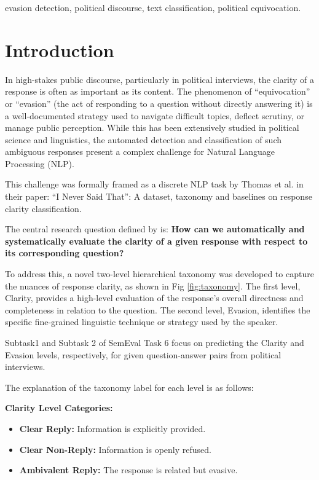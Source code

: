 \documentclass[conference]{IEEEtran}
\begin{document}
\begin{IEEEkeywords}
evasion detection, political discourse, text classification, political equivocation.
\end{IEEEkeywords}

\section{Introduction}
In high-stakes public discourse, particularly in political interviews, the clarity of a response is often as important as its content. The phenomenon of ``equivocation'' or ``evasion'' (the act of responding to a question without directly answering it) is a well-documented strategy used to navigate difficult topics, deflect scrutiny, or manage public perception. While this has been extensively studied in political science and linguistics, the automated detection and classification of such ambiguous responses present a complex challenge for Natural Language Processing (NLP).

This challenge was formally framed as a discrete NLP task by Thomas et al. \cite{b4} in their paper: ``I Never Said That'': A dataset, taxonomy and baselines on response clarity classification.

The central research question defined by \cite{b4} is: \textbf{How can we automatically and systematically evaluate the clarity of a given response with respect to its corresponding question?}

To address this, a novel two-level hierarchical taxonomy was developed to capture the nuances of response clarity, as shown in Fig \ref{fig:taxonomy}. The first level, Clarity, provides a high-level evaluation of the response's overall directness and completeness in relation to the question. The second level, Evasion, identifies the specific fine-grained linguistic technique or strategy used by the speaker.

Subtask1 and Subtask 2 of SemEval Task 6 focus on predicting the Clarity and Evasion levels, respectively, for given question-answer pairs from political interviews.

The explanation of the taxonomy label for each level is as follows:

\textbf{Clarity Level Categories:}

\begin{itemize}
    \item \textbf{Clear Reply:} Information is explicitly provided.
    \item \textbf{Clear Non-Reply:} Information is openly refused.
    \item \textbf{Ambivalent Reply:} The response is related but evasive.
\end{itemize}
\end{document}
